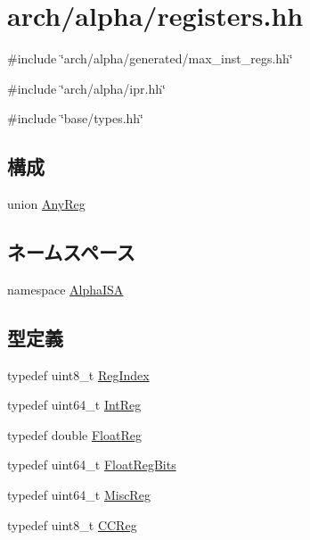\hypertarget{alpha_2registers_8hh}{
\section{arch/alpha/registers.hh}
\label{alpha_2registers_8hh}
}
{\ttfamily \#include \char`\"{}arch/alpha/generated/max\_\-inst\_\-regs.hh\char`\"{}}\par
{\ttfamily \#include \char`\"{}arch/alpha/ipr.hh\char`\"{}}\par
{\ttfamily \#include \char`\"{}base/types.hh\char`\"{}}\par
\subsection*{構成}
\begin{DoxyCompactItemize}
\item 
union \hyperlink{unionAlphaISA_1_1AnyReg}{AnyReg}
\end{DoxyCompactItemize}
\subsection*{ネームスペース}
\begin{DoxyCompactItemize}
\item 
namespace \hyperlink{namespaceAlphaISA}{AlphaISA}
\end{DoxyCompactItemize}
\subsection*{型定義}
\begin{DoxyCompactItemize}
\item 
typedef uint8\_\-t \hyperlink{namespaceAlphaISA_a1c4e98d2e6a11a837bf9ccd20dd32f8a}{RegIndex}
\item 
typedef uint64\_\-t \hyperlink{namespaceAlphaISA_a0e080577527fb3e9685399f75b5caf15}{IntReg}
\item 
typedef double \hyperlink{namespaceAlphaISA_a06fae4f187c7c94b8b0046dd6802be48}{FloatReg}
\item 
typedef uint64\_\-t \hyperlink{namespaceAlphaISA_a6905e424d12491fe126e1a22a9c8d655}{FloatRegBits}
\item 
typedef uint64\_\-t \hyperlink{namespaceAlphaISA_aa16539aa6584fd12f7d6fa868f75b4de}{MiscReg}
\item 
typedef uint8\_\-t \hyperlink{namespaceAlphaISA_a5834599c0196ce4accda8049e7320621}{CCReg}
\end{DoxyCompactItemize}
